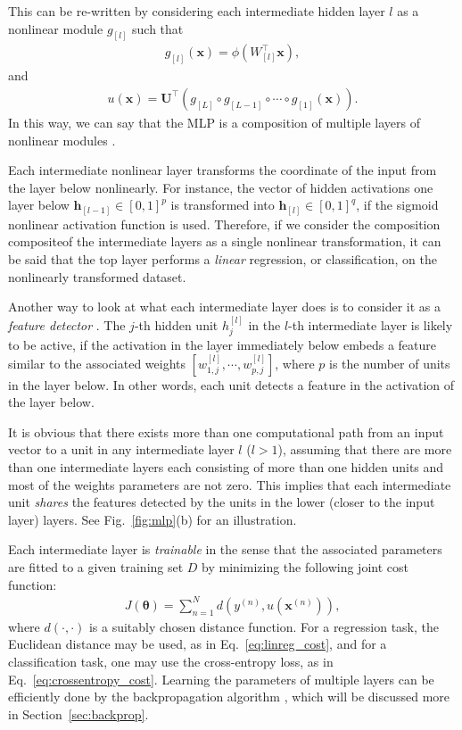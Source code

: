 \documentclass[dissertation,nocontribution,draft*]{aaltoseries}
\newcommand{\qlay}[1]{\left[#1\right]}
\newcommand{\vect}[1]{\mathbf{#1}}
\newcommand{\vects}[1]{\boldsymbol{#1}}
\newcommand{\matr}[1]{\mathbf{#1}}
\newcommand{\vh}[0]{\vect{h}}
\newcommand{\vx}[0]{\vect{x}}
\newcommand{\mU}[0]{\matr{U}}
\newcommand{\TT}[0]{{\vects{\theta}}}
\begin{document}
This can be re-written by considering each intermediate
hidden layer $l$ as a nonlinear module $g_{\qlay{l}}$ such that
\begin{align*}
    g_{\qlay{l}}(\vx) = \phi(W_{\qlay{l}}^\top \vx),
\end{align*}
and
\begin{align*}
    u(\vx) = \mU^\top 
    \left(g_{\qlay{L}} \circ g_{\qlay{L-1}} \circ \cdots
    \circ g_{\qlay{1}} (\vx) \right).
\end{align*}
In this way, we can say that the MLP is a composition of
multiple layers of nonlinear modules \citep{Bengio2007a}.

Each intermediate nonlinear layer transforms the coordinate
of the input from the layer below nonlinearly. For instance,
the vector of hidden activations one layer below
$\vh_{\qlay{l-1}} \in \left[ 0, 1\right]^p$ is transformed into
$\vh_{\qlay{l}} \in \left[0, 1\right]^q$, if the sigmoid nonlinear
activation function is used. Therefore, if we consider the
composition compositeof the intermediate layers as a single nonlinear
transformation, it can be said that the top layer performs a
\textit{linear} regression, or classification, on the
nonlinearly transformed dataset. 

Another way to look at what each intermediate layer does is
to consider it as a \textit{feature detector} \citep[see,
e.g.,][]{Haykin2009}. The $j$-th hidden unit $h_j^{\qlay{l}}$ in
the $l$-th intermediate layer is likely to be active, if the
activation in the layer immediately below embeds a feature
similar to the associated weights $\left[ w_{1,j}^{\qlay{l}},
\cdots, w_{p,j}^{\qlay{l}} \right]$, where $p$ is the number of
units in the layer below. In other words, each unit detects
a feature in the activation of the layer below.

It is obvious that there exists more than one computational
path from an input vector to a unit in any intermediate
layer $l$ ($l > 1$), assuming that there are more than one
intermediate layers each consisting of more than one hidden
units and most of the weights parameters are not zero. This
implies that each intermediate unit \textit{shares} the
features detected by the units in the lower (closer to the
input layer) layers.  See Fig.~\ref{fig:mlp}(b) for an
illustration.

Each intermediate layer is \textit{trainable} in the sense
that the associated parameters are fitted to a given
training set $D$ by minimizing the following joint cost
function:
\begin{align}
    \label{eq:mlp_cost}
    J(\TT) = \sum_{n=1}^N d\left(y^{(n)}, u(\vx^{(n)})\right),
\end{align}
where $d(\cdot, \cdot)$ is a suitably chosen distance
function. For a regression task, the Euclidean distance may be
used, as in Eq.~\eqref{eq:linreg_cost}, and for a
classification task, one may use the cross-entropy loss, as in
Eq.~\eqref{eq:crossentropy_cost}. Learning the parameters of
multiple layers can be efficiently done by the backpropagation
algorithm \citep{Rumelhart1986}, which will be discussed more
in Section~\ref{sec:backprop}.
\end{document}
